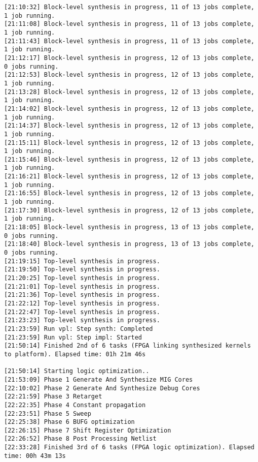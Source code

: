 \begin{lstlisting}[label=code:log_file, caption=Содержимое log-файла, basicstyle=\tiny]
[21:10:32] Block-level synthesis in progress, 11 of 13 jobs complete, 1 job running.
[21:11:08] Block-level synthesis in progress, 11 of 13 jobs complete, 1 job running.
[21:11:43] Block-level synthesis in progress, 11 of 13 jobs complete, 1 job running.
[21:12:17] Block-level synthesis in progress, 12 of 13 jobs complete, 0 jobs running.
[21:12:53] Block-level synthesis in progress, 12 of 13 jobs complete, 1 job running.
[21:13:28] Block-level synthesis in progress, 12 of 13 jobs complete, 1 job running.
[21:14:02] Block-level synthesis in progress, 12 of 13 jobs complete, 1 job running.
[21:14:37] Block-level synthesis in progress, 12 of 13 jobs complete, 1 job running.
[21:15:11] Block-level synthesis in progress, 12 of 13 jobs complete, 1 job running.
[21:15:46] Block-level synthesis in progress, 12 of 13 jobs complete, 1 job running.
[21:16:21] Block-level synthesis in progress, 12 of 13 jobs complete, 1 job running.
[21:16:55] Block-level synthesis in progress, 12 of 13 jobs complete, 1 job running.
[21:17:30] Block-level synthesis in progress, 12 of 13 jobs complete, 1 job running.
[21:18:05] Block-level synthesis in progress, 13 of 13 jobs complete, 0 jobs running.
[21:18:40] Block-level synthesis in progress, 13 of 13 jobs complete, 0 jobs running.
[21:19:15] Top-level synthesis in progress.
[21:19:50] Top-level synthesis in progress.
[21:20:25] Top-level synthesis in progress.
[21:21:01] Top-level synthesis in progress.
[21:21:36] Top-level synthesis in progress.
[21:22:12] Top-level synthesis in progress.
[21:22:47] Top-level synthesis in progress.
[21:23:23] Top-level synthesis in progress.
[21:23:59] Run vpl: Step synth: Completed
[21:23:59] Run vpl: Step impl: Started
[21:50:14] Finished 2nd of 6 tasks (FPGA linking synthesized kernels to platform). Elapsed time: 01h 21m 46s 

[21:50:14] Starting logic optimization..
[21:53:09] Phase 1 Generate And Synthesize MIG Cores
[22:10:02] Phase 2 Generate And Synthesize Debug Cores
[22:21:59] Phase 3 Retarget
[22:22:35] Phase 4 Constant propagation
[22:23:51] Phase 5 Sweep
[22:25:38] Phase 6 BUFG optimization
[22:26:15] Phase 7 Shift Register Optimization
[22:26:52] Phase 8 Post Processing Netlist
[22:33:28] Finished 3rd of 6 tasks (FPGA logic optimization). Elapsed time: 00h 43m 13s 


\end{lstlisting}
